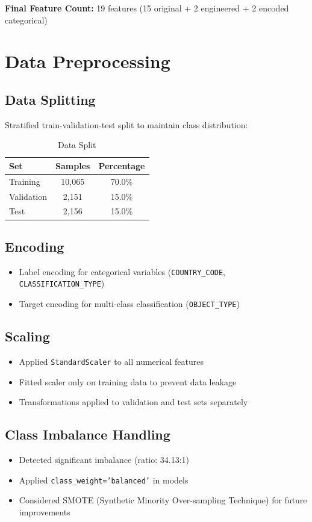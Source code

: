 \documentclass[12pt,a4paper]{article}
\begin{document}
\textbf{Final Feature Count:} 19 features (15 original + 2 engineered + 2 encoded categorical)

\section{Data Preprocessing}

\subsection{Data Splitting}
Stratified train-validation-test split to maintain class distribution:
\begin{table}[H]
\centering
\begin{tabular}{@{}lcc@{}}
\toprule
\textbf{Set} & \textbf{Samples} & \textbf{Percentage} \\
\midrule
Training & 10,065 & 70.0\% \\
Validation & 2,151 & 15.0\% \\
Test & 2,156 & 15.0\% \\
\bottomrule
\end{tabular}
\caption{Data Split}
\label{tab:data_split}
\end{table}

\subsection{Encoding}
\begin{itemize}
    \item Label encoding for categorical variables (\texttt{COUNTRY\_CODE}, \texttt{CLASSIFICATION\_TYPE})
    \item Target encoding for multi-class classification (\texttt{OBJECT\_TYPE})
\end{itemize}

\subsection{Scaling}
\begin{itemize}
    \item Applied \texttt{StandardScaler} to all numerical features
    \item Fitted scaler only on training data to prevent data leakage
    \item Transformations applied to validation and test sets separately
\end{itemize}

\subsection{Class Imbalance Handling}
\begin{itemize}
    \item Detected significant imbalance (ratio: 34.13:1)
    \item Applied \texttt{class\_weight='balanced'} in models
    \item Considered SMOTE (Synthetic Minority Over-sampling Technique) for future improvements
\end{itemize}
\end{document}
